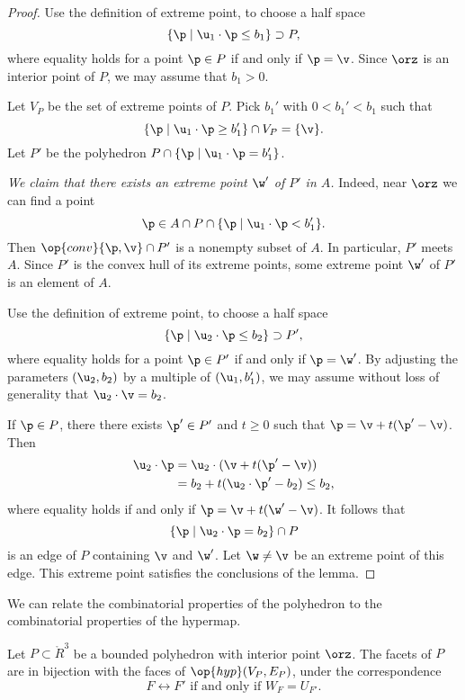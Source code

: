 \begin{proof}  Use the definition of extreme point, to choose a half space
\[
\{ \p \mid \u_1\cdot \p \le b_1\} \supset P,
\]
where equality holds for a point $\p\in P$ if and only if $\p=\v$.
Since $\orz$ is an interior point of $P$, we may assume that $b_1 >0$.

Let $V_P$ be the set of extreme points of $P$.
Pick $b_1'$ with $0<b_1'<b_1$ such that
\[
\{\p \mid \u_1\cdot \p \ge b_1' \} \cap V_P = \{\v\}.
\]
Let $P'$ be the polyhedron 
$P \cap \{\p \mid \u_1 \cdot \p = b_1'\}$.  

{\it We claim that there exists an extreme point $\w'$ of $P'$
in $A$.}  Indeed, near $\orz$ we can find a point 
\[
\p \in A \cap P \cap \{ \p \mid \u_1\cdot \p < b_1'\}.
\]
Then $\op{conv}\{\p,\v\}\cap P'$ is a nonempty subset of $A$.  In
particular, $P'$ meets $A$.  Since $P'$ is the convex hull of its
extreme points, some extreme point $\w'$ of $P'$ is an element of $A$.

Use the definition of extreme point, to choose a half space
\[
\{ \p \mid \u_2 \cdot \p \le b_2\} \supset P',
\]
where equality holds for a point $\p\in P'$ if and only if $\p=\w'$.
By adjusting the parameters $(\u_2,b_2)$ by a multiple of
$(\u_1,b'_1)$, we may assume without loss of generality that $\u_2\cdot
\v = b_2$.

If $\p\in P$, there there exists $\p'\in P'$ and $t\ge0$ such that $\p
= \v + t (\p'-\v)$.  Then
\begin{align*}
\u_2\cdot \p &= \u_2\cdot (\v + t (\p'-\v))\\
&= b_2 + t (\u_2\cdot \p' - b_2) \le b_2,
\end{align*}
where equality holds if and only if $\p = \v + t (\w' - \v)$.   It
follows that
\[
\{\p \mid \u_2 \cdot \p = b_2\} \cap P
\]
is an edge of $P$ containing $\v$ and $\w'$.  Let $\w\ne\v$ be an
extreme point of this edge.  This extreme point satisfies the
conclusions of the lemma.
\end{proof}

We can relate the combinatorial properties of the polyhedron to the
combinatorial properties of the hypermap.

\begin{lemma}[]\cutrate{}\label{lemma:facet-bi}
Let $P\subset\ring{R}^3$ be a bounded polyhedron with interior point
$\orz$.  The facets of $P$ are in bijection with the faces of
$\op{hyp}(V_P,E_P)$, under the correspondence
\[ 
F\leftrightarrow F' \text{ if and only if } W_F = U_{F'}.
\] 
\end{lemma}

